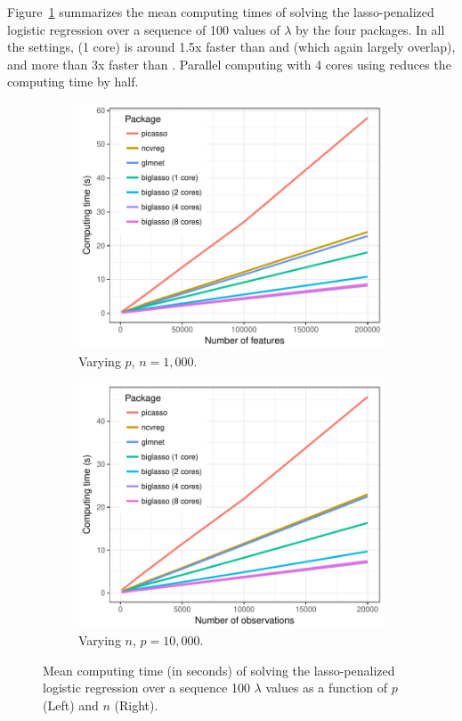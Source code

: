 Figure~\ref{fig_simu_res_log} summarizes the mean computing times of solving the lasso-penalized logistic regression over a sequence of 100 values of $\lambda$ by the four packages. In all the settings,  (1 core) is around 1.5x faster than  and  (which again largely overlap), and more than 3x faster than . Parallel computing with 4 cores using  reduces the computing time by half.

\begin{figure}[ht]
\centering
\begin{subfigure}{.5\textwidth}
  \centering
  \includegraphics[width=\linewidth]{Figures/2018-02-27_vary_p_pkgs_logistic.pdf}
  \caption{Varying $p$, $n = 1,000$.}
\end{subfigure}%
\begin{subfigure}{.5\textwidth}
  \centering
  \includegraphics[width=\linewidth]{Figures/2018-02-27_vary_n_pkgs_logistic.pdf}
  \caption{Varying $n$, $p = 10,000$.}
\end{subfigure}
\caption{Mean computing time (in seconds) of solving the lasso-penalized logistic regression over a sequence 100 $\lambda$ values as a function of $p$ (Left) and $n$ (Right).}
\label{fig_simu_res_log}
\end{figure}


